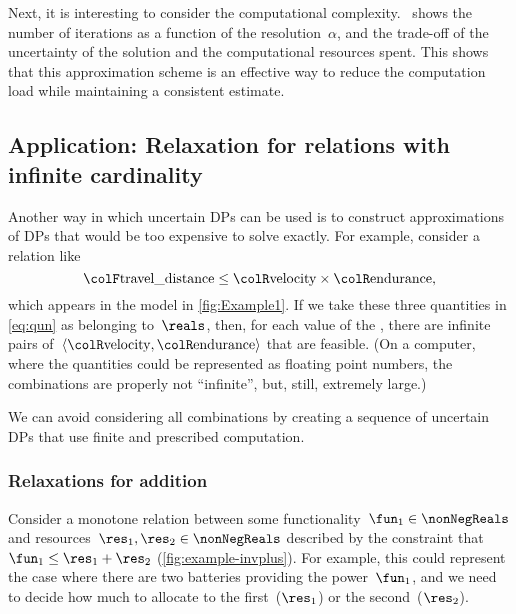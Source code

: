 Next, it is interesting to consider the computational complexity.
~shows the number of iterations as
a function of the resolution~$\alpha$, and the trade-off of the
uncertainty of the solution and the computational resources spent.
This shows that this approximation scheme is an effective way to reduce
the computation load while maintaining a consistent estimate.

\subsection{Application: Relaxation for relations with infinite cardinality\label{sec:Application-relax}}

Another way in which uncertain DPs can be used is to construct approximations
of DPs that would be too expensive to solve exactly.
For example,
consider a relation like
\begin{equation}
{\colF\text{travel\_distance}}
    \leq{\colR\text{velocity}}\times{\colR\text{endurance}},\label{eq:qun}
\end{equation}
which appears in the model in \cref{fig:Example1}.
If we take
these three quantities in \cref{eq:qun} as belonging to~$\reals$,
then, for each value of the , there are infinite
pairs of~$\left\langle {\colR\text{velocity}},{\colR\text{endurance}}\right\rangle $
that are feasible. (On a computer, where the quantities could be represented
as floating point numbers, the combinations are properly not ``infinite'',
but, still, extremely large.)

We can avoid considering all combinations by creating a sequence of
uncertain DPs that use finite and prescribed computation.

\subsubsection{Relaxations for addition}

Consider a monotone relation between some functionality~$\fun_{1}\in\nonNegReals$
and resources~$\res_{1},\res_{2}\in\nonNegReals$ described by
the constraint that~$\fun_{1}\leq\res_{1}+\res_{2}$ (\cref{fig:example-invplus}).
For example, this could represent the case where there are two batteries
providing the power~$\fun_{1}$, and we need to decide how much to
allocate to the first~($\res_{1}$) or the second~($\res_{2}$).



